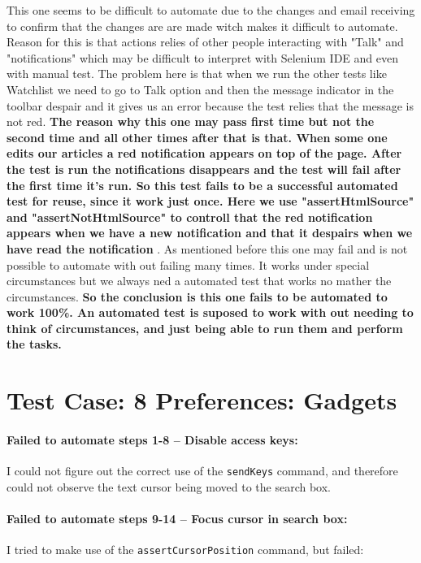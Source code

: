 \documentclass[a4paper,10pt]{article}
\begin{document}
This one seems to be difficult to automate due to the changes and email receiving to confirm that the changes are 
are made witch makes it difficult to automate. Reason for this is that actions relies of other people interacting with "Talk"
and "notifications" which may be difficult to interpret with Selenium IDE and even with manual test. The problem here is that when we run
the other tests like Watchlist we need to go to Talk option and then the message indicator in the toolbar despair and it gives us an error
because the test relies that the message is not red. \textbf{\color{red} The reason why this one may pass first time
but not the second time and all other times after that is that. When some one edits our articles a red notification appears
on top of the page. After the test is run the notifications disappears and the test will fail after the first time it's run.
So this test fails to be a successful automated test for reuse, since it work just once. Here we use "assertHtmlSource" and 
"assertNotHtmlSource" to controll that the red notification appears when we have a new notification and that it despairs 
when we have read the notification }. As mentioned before this one may fail and is not possible to automate with out failing many times.
It works under special circumstances but we always ned a automated test that works no mather the circumstances. \textbf{\color{red}So the conclusion is
this one fails to be automated to work 100\%. 
An automated test is suposed to work with out needing to think of circumstances, and just being able to run them and perform the tasks.}


\section*{Test Case: 8 Preferences: Gadgets}

\paragraph*{Failed to automate steps 1-8 -- Disable access keys:} I could not figure out the correct use of the \texttt{sendKeys} command, and therefore could not observe the text cursor being 
moved to the search box.

\paragraph*{Failed to automate steps 9-14 -- Focus cursor in search box:} I tried to make use of the \texttt{assertCursorPosition} command, but failed:
\end{document}

